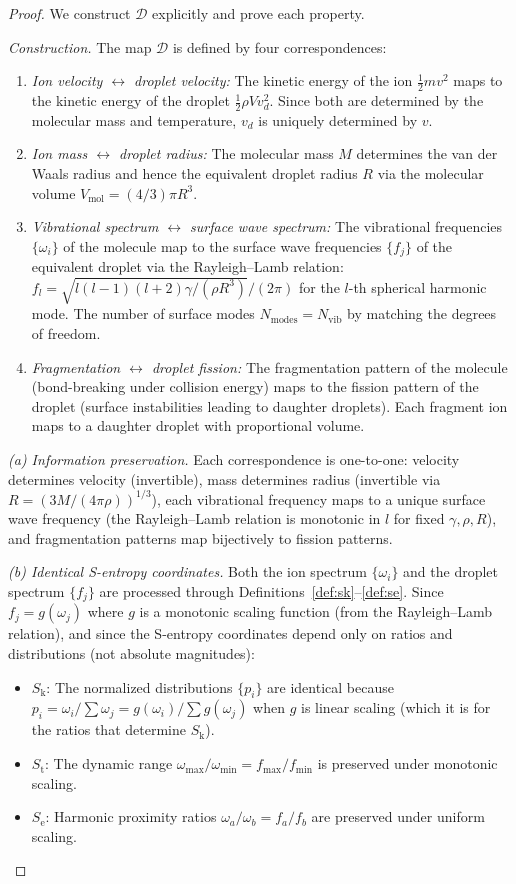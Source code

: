 \documentclass[11pt,twocolumn,a4paper]{article}
\theoremstyle{definition}
\theoremstyle{remark}
\newcommand{\Sk}{S_{\mathrm{k}}}
\newcommand{\St}{S_{\mathrm{t}}}
\newcommand{\Se}{S_{\mathrm{e}}}
\newcommand{\Nvib}{N_{\mathrm{vib}}}
\begin{document}
\begin{proof}
We construct $\mathcal{D}$ explicitly and prove each property.

\emph{Construction.} The map $\mathcal{D}$ is defined by four correspondences:
\begin{enumerate}
  \item \emph{Ion velocity $\leftrightarrow$ droplet velocity:} The kinetic energy of the ion $\tfrac{1}{2}mv^2$ maps to the kinetic energy of the droplet $\tfrac{1}{2}\rho V v_d^2$. Since both are determined by the molecular mass and temperature, $v_d$ is uniquely determined by $v$.
  \item \emph{Ion mass $\leftrightarrow$ droplet radius:} The molecular mass $M$ determines the van der Waals radius and hence the equivalent droplet radius $R$ via the molecular volume $V_{\mathrm{mol}} = (4/3)\pi R^3$.
  \item \emph{Vibrational spectrum $\leftrightarrow$ surface wave spectrum:} The vibrational frequencies $\{\omega_i\}$ of the molecule map to the surface wave frequencies $\{f_j\}$ of the equivalent droplet via the Rayleigh--Lamb relation: $f_{l} = \sqrt{l(l-1)(l+2)\gamma/(\rho R^3)} / (2\pi)$ for the $l$-th spherical harmonic mode. The number of surface modes $N_{\mathrm{modes}} = \Nvib$ by matching the degrees of freedom.
  \item \emph{Fragmentation $\leftrightarrow$ droplet fission:} The fragmentation pattern of the molecule (bond-breaking under collision energy) maps to the fission pattern of the droplet (surface instabilities leading to daughter droplets). Each fragment ion maps to a daughter droplet with proportional volume.
\end{enumerate}

\emph{(a) Information preservation.} Each correspondence is one-to-one: velocity determines velocity (invertible), mass determines radius (invertible via $R = (3M/(4\pi\rho))^{1/3}$), each vibrational frequency maps to a unique surface wave frequency (the Rayleigh--Lamb relation is monotonic in $l$ for fixed $\gamma, \rho, R$), and fragmentation patterns map bijectively to fission patterns.

\emph{(b) Identical S-entropy coordinates.} Both the ion spectrum $\{\omega_i\}$ and the droplet spectrum $\{f_j\}$ are processed through Definitions~\ref{def:sk}--\ref{def:se}. Since $f_j = g(\omega_j)$ where $g$ is a monotonic scaling function (from the Rayleigh--Lamb relation), and since the S-entropy coordinates depend only on ratios and distributions (not absolute magnitudes):
\begin{itemize}
  \item $\Sk$: The normalized distributions $\{p_i\}$ are identical because $p_i = \omega_i/\sum \omega_j = g(\omega_i)/\sum g(\omega_j)$ when $g$ is linear scaling (which it is for the ratios that determine $\Sk$).
  \item $\St$: The dynamic range $\omega_{\max}/\omega_{\min} = f_{\max}/f_{\min}$ is preserved under monotonic scaling.
  \item $\Se$: Harmonic proximity ratios $\omega_a/\omega_b = f_a/f_b$ are preserved under uniform scaling.
\end{itemize}


\end{proof}
\end{document}
